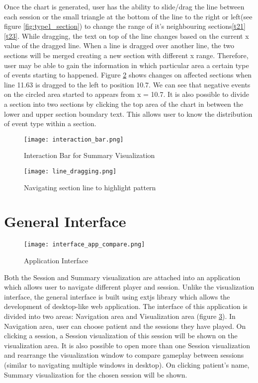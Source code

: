 Once the chart is generated, user has the ability to slide/drag the line between each session or the small triangle at the bottom of the line to the right or left(see figure \ref{fig:type1_section}) to change the range of it's neighbouring sections\ref{t21}\ref{t23}. While dragging, the text on top of the line changes based on the current x value of the dragged line. When a line is dragged over another line, the two sections will be merged creating a new section with different x range. Therefore, user may be able to gain the information in which particular area a certain type of events starting to happened. Figure \ref{fig:line_dragging} shows changes on affected sections when line 11.63 is dragged to the left to position 10.7. We can see that negative events on the circled area started to appears from x = 10.7. It is also possible to divide a section into two sections by clicking the top area of the chart in between the lower and upper section boundary text. This allows user to know the distribution of event type within a section.

\begin{figure}
\centering
\texttt{[image: interaction\_bar.png]}
\caption{Interaction Bar for Summary Visualization}
\label{fig:interaction_bar}
\end{figure}
\begin{figure}
\centering
\texttt{[image: line\_dragging.png]}
\caption{Navigating section line to highlight pattern}
\label{fig:line_dragging}
\end{figure}
\section{General Interface}
\begin{figure}
\centering
\texttt{[image: interface\_app\_compare.png]}
\caption{Application Interface}
\label{fig:app_interface}
\end{figure}
Both the Session and Summary visualization are attached into an application which allows user to navigate different player and session. Unlike the visualization interface, the general interface is built using extjs library which allows the development of desktop-like web application. The interface of this application is divided into two areas: Navigation area and Visualization area (figure \ref{fig:app_interface}). In Navigation area, user can choose patient and the sessions they have played. On clicking a session, a Session visualization of this session will be shown on the visualization area. It is also possible to open more than one Session visualization and rearrange the visualization window to compare gameplay between sessions (similar to navigating multiple windows in desktop). On clicking patient's name, Summary visualization for the chosen session will be shown.

